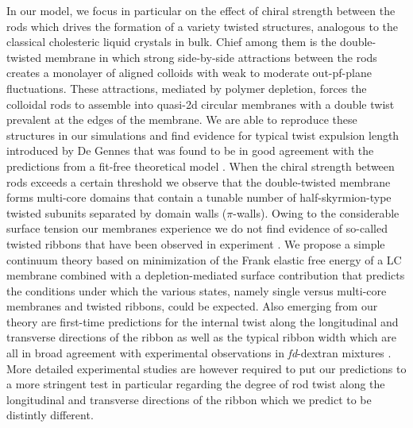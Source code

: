 In our model, we focus in particular on the effect of chiral strength between the rods which drives the formation of a variety twisted structures, analogous to the classical cholesteric liquid crystals in bulk. Chief among them is the double-twisted membrane in which  strong  side-by-side attractions between the rods creates a monolayer of aligned colloids with weak to moderate out-pf-plane fluctuations. These attractions, mediated by polymer depletion, forces the colloidal rods to assemble into quasi-2d circular membranes with a double twist prevalent at the edges of the membrane. We are able to reproduce these structures in our simulations and find evidence for typical twist expulsion length introduced by De Gennes \cite{gennes-prost} that was found to be in good agreement with the predictions from a fit-free  theoretical model \cite{wensink2018elastic}.  When the chiral strength between rods exceeds a certain threshold we observe that the double-twisted membrane forms multi-core domains that contain a tunable number of half-skyrmion-type twisted subunits separated by domain walls ($\pi$-walls).  Owing to the considerable surface tension our membranes experience we do not find evidence of so-called twisted ribbons that have been observed in experiment \cite{Gibaud2012}. We propose a simple continuum theory based on minimization of the Frank elastic free energy of a LC membrane combined with a depletion-mediated surface contribution that predicts the conditions under which the various states, namely single versus multi-core membranes and twisted ribbons, could be expected.  Also emerging from our theory are first-time predictions for the internal twist along the longitudinal and transverse directions of the ribbon as well as the typical ribbon width which are all in broad agreement with experimental observations in {\em fd}-dextran mixtures \cite{Gibaud2012,kang_sm2016}. More detailed experimental studies are however required to put our predictions to a more stringent test in particular regarding the degree of rod twist along the longitudinal and transverse directions of the ribbon which we predict to be distintly different.

